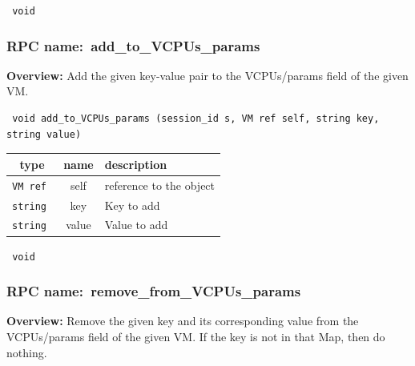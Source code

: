 \vspace{0.3cm}

{\tt 
void
}



\vspace{0.3cm}
\vspace{0.3cm}
\vspace{0.3cm}
\subsubsection{RPC name:~add\_to\_VCPUs\_params}

{\bf Overview:} 
Add the given key-value pair to the VCPUs/params field of the given VM.

\begin{verbatim} void add_to_VCPUs_params (session_id s, VM ref self, string key, string value)\end{verbatim}



 
\vspace{0.3cm}
\begin{tabular}{|c|c|p{7cm}|}
 \hline
{\bf type} & {\bf name} & {\bf description} \\ \hline
{\tt VM ref } & self & reference to the object \\ \hline 

{\tt string } & key & Key to add \\ \hline 

{\tt string } & value & Value to add \\ \hline 

\end{tabular}

\vspace{0.3cm}

{\tt 
void
}



\vspace{0.3cm}
\vspace{0.3cm}
\vspace{0.3cm}
\subsubsection{RPC name:~remove\_from\_VCPUs\_params}

{\bf Overview:} 
Remove the given key and its corresponding value from the VCPUs/params
field of the given VM.  If the key is not in that Map, then do nothing.

